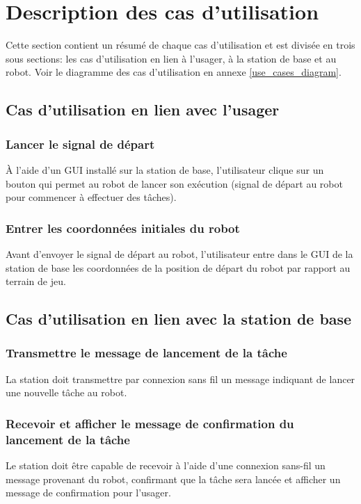 


\chapter{Description des cas d'utilisation}
\label{s:utilisation}
Cette section contient un résumé de chaque cas d'utilisation et est divisée en trois sous sections: les cas d'utilisation en lien à l'usager, à la station de base et au robot. 
Voir le diagramme des cas d'utilisation en annexe \ref{use_cases_diagram}.
\section{Cas d'utilisation en lien avec l'usager}
\subsection{Lancer le signal de départ}
À l'aide d'un GUI installé sur la station de base, l'utilisateur clique sur un bouton qui permet au robot de lancer son exécution (signal de départ au robot pour commencer à effectuer des tâches).
\subsection{Entrer les coordonnées initiales du robot}
Avant d'envoyer le signal de départ au robot, l'utilisateur entre dans le GUI de la station de base les coordonnées de la position de départ du robot par rapport au terrain de jeu.
\section{Cas d'utilisation en lien avec la station de base}
\subsection{Transmettre le message de lancement de la tâche}
La station doit transmettre par connexion sans fil un message indiquant de lancer une nouvelle tâche au robot.
\subsection{Recevoir et afficher  le message de confirmation du lancement de la tâche}
Le station doit être capable de recevoir à l'aide d'une connexion sans-fil un message provenant du robot, confirmant que la tâche sera lancée et afficher un message de confirmation pour l'usager.
